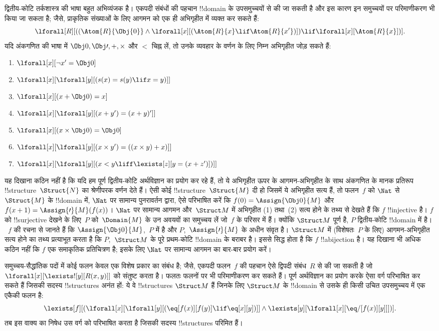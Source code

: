 \documentclass[../../../include/open-logic-section]{subfiles}
\begin{document}
द्वितीय-कोटि तर्कशास्त्र की भाषा बहुत अभिव्यंजक है। एकपदी संबंधों की पहचान
!!{domain} के उपसमुच्चयों से की जा सकती है और इस कारण इन समुच्चयों पर
परिमाणीकरण भी किया जा सकता है; जैसे, प्राकृतिक संख्याओं के लिए आगमन को एक
ही अभिगृहीत में व्यक्त कर सकते हैं:
\[
\lforall[R][((\Atom{R}{\Obj{0}} \land \lforall[x][(\Atom{R}{x} \lif
    \Atom{R}{x'})]) \lif \lforall[x][\Atom{R}{x}])].
\]
यदि अंकगणित की भाषा में $\Obj 0, \Obj \prime, +,
\times$ और $<$ चिह्न लें,
तो उनके व्यवहार के वर्णन के लिए निम्न अभिगृहीत जोड़ सकते हैं:
\begin{enumerate}
\item $\lforall[x][\lnot x' = \Obj 0]$
\item $\lforall[x][\lforall[y][(s(x) = s(y) \lif x = y)]]$
\item $\lforall[x][(x + \Obj 0) = x]$
\item $\lforall[x][\lforall[y][(x + y') = (x + y)']]$
\item $\lforall[x][(x \times \Obj 0) = \Obj 0]$
\item $\lforall[x][\lforall[y][(x \times y') = ((x \times y) + x)]]$
\item $\lforall[x][\lforall[y][(x < y \liff \lexists[z][y = (x + z')])]]$
\end{enumerate}
यह दिखाना कठिन नहीं है कि यदि हम पूर्ण द्वितीय-कोटि अर्थविज्ञान का प्रयोग
कर रहे हैं, तो ये अभिगृहीत ऊपर के आगमन-अभिगृहीत के साथ अंकगणित के मानक
प्रतिरूप !!{structure}~$\Struct{N}$ का श्रेणीपरक वर्णन देते हैं। ऐसी कोई
!!{structure}~$\Struct{M}$ दी हो जिसमें ये अभिगृहीत सत्य हैं, तो फलन~$f$ को
$\Nat$ से $\Struct{M}$ के !!{domain} में, $\Nat$ पर सामान्य पुनरावर्तन
द्वारा, ऐसे परिभाषित करें कि $f(0) = \Assign{\Obj 0}{M}$ और
$f(x+1) = \Assign{\prime}{M}(f(x))$। $\Nat$ पर सामान्य आगमन और~$\Struct M$ में
अभिगृहीत (1) तथा~(2) सत्य होने के तथ्य से देखते हैं कि $f$ !!{injective}
है। $f$ को !!{surjective} देखने के लिए~$P$ को~$\Domain{M}$ के उन अवयवों का
समुच्चय लें जो~$f$ के परिसर में हैं। क्योंकि $\Struct M$ पूर्ण है, $P$
द्वितीय-कोटि !!{domain} में है।~$f$ की रचना से जानते हैं कि
$\Assign{\Obj
  0}{M}$,~$P$ में है और $P$,~$\Assign{\prime}{M}$ के अधीन संवृत
है। $\Struct M$ में (विशेषतः~$P$ के लिए) आगमन-अभिगृहीत सत्य होने का तथ्य
प्रत्याभूत करता है कि $P$,~$\Struct M$ के पूरे प्रथम-कोटि !!{domain} के
बराबर है। इससे सिद्ध होता है कि $f$ !!a{bijection} है। यह दिखाना भी अधिक
कठिन नहीं कि $f$ एक समाकृतिक प्रतिचित्रण है; इसके लिए $\Nat$ पर सामान्य आगमन का बार-बार
प्रयोग करें।

समुच्चय-सैद्धांतिक पदों में कोई फलन केवल एक विशेष प्रकार का संबंध है; जैसे,
एकपदी फलन~$f$ की पहचान ऐसे द्विपदी संबंध~$R$ से की जा सकती है जो
$\lforall[x][\lexists![y][R(x,y)]]$ को संतुष्ट करता है। फलतः फलनों पर भी परिमाणीकरण कर सकते
हैं। पूर्ण अर्थविज्ञान का प्रयोग करके ऐसा वर्ग परिभाषित कर सकते हैं जिसकी
सदस्य !!{structure}s अनंत हों: ये वे !!{structure}s $\Struct M$ हैं जिनके लिए $\Struct M$
के !!{domain} से उसके ही किसी उचित उपसमुच्चय में एक एकैकी फलन है:
\[
\lexists[f][(\lforall[x][\lforall[y][(\eq[f(x)][f(y)] \lif \eq[x][y])]]
  \land \lexists[y][\lforall[x][\eq/[f(x)][y]]])].
\]
तब इस वाक्य का निषेध उस वर्ग को परिभाषित करता है जिसकी सदस्य
!!{structure}s परिमित हैं।
\end{document}

